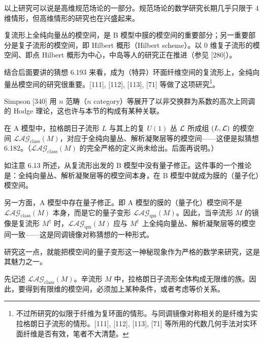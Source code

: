 以上研究可以说是高维规范场论的一部分。规范场论的数学研究长期几乎只限于 4 维情形，但高维情形的研究也在兴盛起来。

复流形上全纯向量丛的模空间，是 B 模型中膜的模空间的重要部分；另一重要部分是复子流形的模空间，即 Hilbert 概形（Hilbert scheme）。以 0 维复子流形的模空间、即点 Hilbert 概形为中心，中岛等人的研究正在推进（参见 [280]）。

结合后面要讲的猜想 6.193 来看，成为（特异）环面纤维空间的复流形上，全纯向量丛模空间的研究很重要。[111], [112], [113], [71] 等做了这项研究\footnote{不过所研究的似限于纤维为复环面的情形。与同调镜像对称相关的是纤维为实拉格朗日子流形的情形。[111], [112], [113], [71] 等所用的代数几何手法对实环面纤维是否有效，笔者不大清楚。}。

Simpson [340] 用 $n$ 范畴（$n$ category）等展开了以非交换群为系数的高次上同调的 Hodge 理论，这也许与本节的构成有某种关联。

在 A 模型中，拉格朗日子流形 $L$ 与其上的复 $U(1)$ 丛 $\mathcal{L}$ 所成组 $(L,\mathcal{L})$ 的模空间 $\mathcal{LAG}_{\mathrm{class}}(M)$，对应于全纯向量丛、解析凝聚层等的模空间——这便是拟猜想 6.182。（$\mathcal{LAG}_{\mathrm{class}}(M)$ 的完全严格的定义尚未给出。后面再说明。）

如注意 6.13 所述，从复流形出发的 B 模型中没有量子修正。这件事的一个推论是：全纯向量丛、解析凝聚层等的模空间本身，在 B 模型中就成为膜的（量子化）模空间。

另一方面，A 模型中存在量子修正。即 A 模型的膜的（量子化）模空间不是 $\mathcal{LAG}_{\mathrm{class}}(M)$ 本身，而是它的量子变形 $\mathcal{LAG}_{\mathrm{qm}}(M)$。因此，当辛流形 $M$ 的镜像是复流形 $M^\dagger$ 时，$\mathcal{LAG}_{\mathrm{qm}}(M)$ 应与 $M^\dagger$ 上全纯向量丛、解析凝聚层等的模空间一致——这是同调镜像对称猜想的一种形式。

研究这一点，就能把模空间的量子变形这一神秘现象作为严格的数学来研究，这是其魅力之一。

先记述 $\mathcal{LAG}_{\mathrm{class}}(M)$。辛流形 $M$ 中，拉格朗日子流形全体构成无限维的族。因此，要得到有限维的模空间，必须加上某种条件，或者考虑等价关系。
